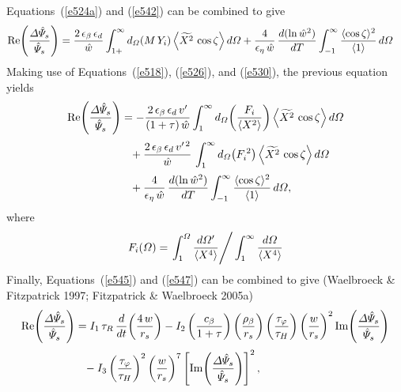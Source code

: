 \documentclass[notitlepage,12pt]{article}
\begin{document}
Equations~(\ref{e524a}) and (\ref{e542}) can be combined to give
\begin{align}
{\rm Re}\!\left(\frac{{\mit\Delta}\hat{\mit\Psi}_s}{\hat{\mit\Psi}_s}\right)&= \frac{2\,\epsilon_\beta\,\epsilon_d}{\hat{w}}
\int_{1+}^\infty d_{\mit\Omega}(M\,Y_i)\left\langle\widetilde{X^2}\,\cos\zeta\right\rangle d{\mit\Omega}
+\frac{4}{\epsilon_\eta\,\hat{w}}\,\frac{d(\ln \hat{w}^2)}{dT}\int_{-1}^\infty \frac{\langle \cos\zeta\rangle^2}{\langle 1\rangle}\,d{\mit\Omega}
\end{align}
Making use of Equations~(\ref{e518}), (\ref{e526}), and (\ref{e530}), the previous equation yields
\begin{align}
{\rm Re}\!\left(\frac{{\mit\Delta}\hat{\mit\Psi}_s}{\hat{\mit\Psi}_s}\right)&= -\frac{2\,\epsilon_\beta\,\epsilon_d\,v'}{(1+\tau)\,\hat{w}}
\int_1^\infty d_{\mit\Omega}\!\left(\frac{F_i}{\langle X^2\rangle}\right)\left\langle\widetilde{X^2}\,\cos\zeta\right\rangle d{\mit\Omega}
\nonumber\\[0.5ex]
&\phantom{=}+ \frac{2\,\epsilon_\beta\,\epsilon_d\,v'^{\,2}}{\hat{w}} \,\int_1^\infty d_{\mit\Omega}\!\left(F_i^{\,2}\right)\left\langle\widetilde{X^2}\,\cos\zeta\right\rangle d{\mit\Omega}\nonumber\\[0.5ex]
&\phantom{=}+\frac{4}{\epsilon_\eta\,\hat{w}}\,\frac{d(\ln \hat{w}^2)}{dT}\int_{-1}^\infty \frac{\langle \cos\zeta\rangle^2}{\langle 1\rangle}\,d{\mit\Omega},\label{e547}
\end{align}
where
\begin{equation}
F_i({\mit\Omega})=\left.\int_1^{\mit\Omega}\frac{d{\mit\Omega}'}{\langle X^4\rangle}\right/\int_1^\infty\frac{d{\mit\Omega}}{\langle X^4\rangle}
\end{equation}
Finally, Equations~(\ref{e545}) and (\ref{e547})
can be combined to give (Waelbroeck \& Fitzpatrick 1997; Fitzpatrick \& Waelbroeck 2005a)
\begin{align}\label{e559}
{\rm Re}\!\left(\frac{{\mit\Delta}\hat{\mit\Psi}_s}{\hat{\mit\Psi}_s}\right)&= I_1\,\tau_R\,\frac{d}{dt}\!\left(\frac{4\,w}{r_s}\right)
- I_2\left(\frac{c_\beta}{1+\tau}\right)\left(\frac{\rho_\beta}{r_s}\right)\left(\frac{\tau_\varphi}{\tau_H}\right)\left(\frac{w}{r_s}\right)^2 {\rm Im}\!\left(\frac{{\mit\Delta}\hat{\mit\Psi}_s}{\hat{\mit\Psi}_s}\right)\nonumber\\[0.5ex]
&\phantom{=} -I_3\left(\frac{\tau_\varphi}{\tau_H}\right)^2 \left(\frac{w}{r_s}\right)^7\left[{\rm Im}\!\left(\frac{{\mit\Delta}\hat{\mit\Psi}_s}{\hat{\mit\Psi}_s}\right)\right]^2, 
\end{align}
\end{document}
